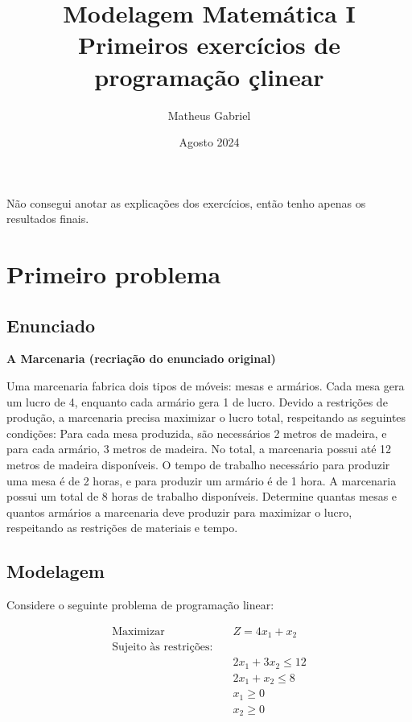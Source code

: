 \documentclass{article}
\title{Modelagem Matemática I \\ 
        \large Primeiros exercícios de programação çlinear}
\author{Matheus Gabriel}
\date{Agosto 2024}
\begin{document}
\maketitle

\begin{tcolorbox}[colback=yellow!10!white, colframe=yellow!75!black, title=Aviso]
Não consegui anotar as explicações dos exercícios, então tenho apenas os resultados finais. 
\end{tcolorbox}

\section{Primeiro problema}

\subsection{Enunciado}
\begin{mdframed}[backgroundcolor=yellow!10, linecolor=black, linewidth=2pt]
\textbf{A Marcenaria (recriação do enunciado original)}

Uma marcenaria fabrica dois tipos de móveis: mesas e armários. Cada mesa gera um lucro de 4, enquanto cada armário gera 1 de lucro. Devido a restrições de produção, a marcenaria precisa maximizar o lucro total, respeitando as seguintes condições:
Para cada mesa produzida, são necessários 2 metros de madeira, e para cada armário, 3 metros de madeira. No total, a marcenaria possui até 12 metros de madeira disponíveis.
O tempo de trabalho necessário para produzir uma mesa é de 2 horas, e para produzir um armário é de 1 hora. A marcenaria possui um total de 8 horas de trabalho disponíveis.
Determine quantas mesas e quantos armários a marcenaria deve produzir para maximizar o lucro, respeitando as restrições de materiais e tempo.
\end{mdframed}

\subsection{Modelagem}

Considere o seguinte problema de programação linear:

\begin{align*}
    \text{Maximizar} \quad & Z = 4x_1 + x_2 \\
    \text{Sujeito às restrições:} \quad & \\
    & 2x_1 + 3x_2 \leq 12 \\
    & 2x_1 + x_2 \leq 8 \\
    & x_1 \geq 0 \\
    & x_2 \geq 0
\end{align*}
\end{document}
